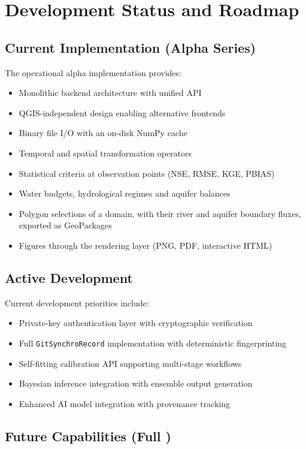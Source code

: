 \section{Development Status and Roadmap}

\subsection{Current Implementation (Alpha Series)}

The operational alpha implementation provides:
\begin{itemize}
\item Monolithic backend architecture with unified API
\item QGIS-independent design enabling alternative frontends
\item Binary file I/O with an on-disk NumPy cache
\item Temporal and spatial transformation operators
\item Statistical criteria at observation points (NSE, RMSE, KGE, PBIAS)
\item Water budgets, hydrological regimes and aquifer balances
\item Polygon selections of a domain, with their river and aquifer boundary fluxes, exported as GeoPackages
\item Figures through the rendering layer (PNG, PDF, interactive HTML)
\end{itemize}

\subsection{Active Development}

Current development priorities include:
\begin{itemize}
\item Private-key authentication layer with cryptographic verification
\item Full \texttt{GitSynchroRecord} implementation with deterministic fingerprinting
\item Self-fitting calibration API supporting multi-stage workflows
\item Bayesian inference integration with ensemble output generation
\item Enhanced AI model integration with provenance tracking
\end{itemize}

\subsection{Future Capabilities (Full \hydrot)}

